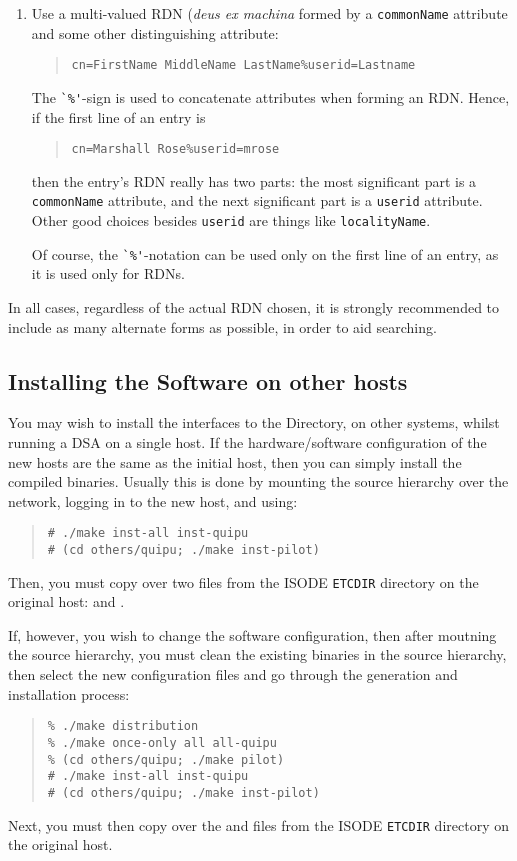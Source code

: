 \begin{enumerate}
\item	Use a multi-valued RDN ({\em deus ex machina\/} formed by a
\verb"commonName" attribute and some other distinguishing attribute:
\begin{quote}\small\begin{verbatim}
cn=FirstName MiddleName LastName%userid=Lastname
\end{verbatim}\end{quote}
The \verb"`%'"-sign is used to concatenate attributes when forming an RDN.
Hence,
if the first line of an entry is
\begin{quote}\small\begin{verbatim}
cn=Marshall Rose%userid=mrose
\end{verbatim}\end{quote}
then the entry's RDN really has two parts:
the most significant part is a \verb"commonName" attribute,
and the next significant part is a \verb"userid" attribute.
Other good choices besides \verb"userid" are things like \verb"localityName".

Of course,
the \verb"`%'"-notation can be used only on the first line of an entry,
as it is used only for RDNs.
\end{enumerate}
In all cases,
regardless of the actual RDN chosen,
it is strongly recommended to include as many alternate forms as possible,
in order to aid searching.

\subsection	{Installing the Software on other hosts}
You may wish to install the interfaces to the Directory,
on other systems,
whilst running a DSA on a single host.
If the hardware/software configuration of the new hosts are the same as the
initial host,
then you can simply install the compiled binaries.
Usually this is done by mounting the source hierarchy over the network,
logging in to the new host,
and using:
\begin{quote}\small\begin{verbatim}
# ./make inst-all inst-quipu
# (cd others/quipu; ./make inst-pilot)
\end{verbatim}\end{quote}
Then,
you must copy over two files from the ISODE \verb"ETCDIR" directory on the
original host:  and .

If, however, you wish to change the software configuration,
then after moutning the source hierarchy,
you must clean the existing binaries in the source hierarchy,
then select the new configuration files and go through the generation and
installation process:
\begin{quote}\small\begin{verbatim}
% ./make distribution
% ./make once-only all all-quipu
% (cd others/quipu; ./make pilot)
# ./make inst-all inst-quipu
# (cd others/quipu; ./make inst-pilot)
\end{verbatim}\end{quote}
Next, you must then copy over the  and  files
from the ISODE \verb"ETCDIR" directory on the original host.
